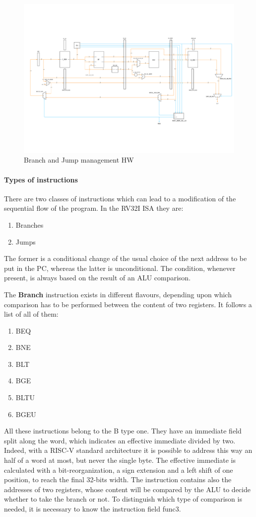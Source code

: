 \documentclass[a4paper]{article}
\begin{document}
\begin{figure}[hbtp]
    \centering
    \includegraphics[scale=0.2]{../br_jmp_management/ref/schematic/branchJump_management_schematic_5stages.pdf}
    \caption{Branch and Jump management HW}
    \label{fig:brJump_man_HW}
\end{figure}

\paragraph{Types of instructions}
There are two classes of instructions which can lead to a modification of the sequential flow of the program. In the RV32I ISA they are:
\begin{enumerate}
	\item Branches
	\item Jumps
\end{enumerate} 
The former is a conditional change of the usual choice of the next address to be put in the PC, whereas the latter is unconditional. The condition, whenever present, is always based on the result of an ALU comparison.

The \textbf{Branch} instruction exists in different flavours, depending upon which comparison has to be performed between the content of two registers. It follows a list of all of them:
\begin{enumerate}
	\item BEQ
	\item BNE
	\item BLT
	\item BGE
	\item BLTU
	\item BGEU
\end{enumerate} 
All these instructions belong to the B type one. They have an immediate field split along the word, which indicates an effective immediate divided by two. Indeed, with a RISC-V standard architecture it is possible to address this way an half of a word at most, but never the single byte.
The effective immediate is calculated with a bit-reorganization, a sign extension and a left shift of one position, to reach the final 32-bits width.
The instruction contains also the addresses of two registers, whose content will be compared by the ALU to decide whether to take the branch or not. 
To distinguish which type of comparison is needed, it is necessary to know the instruction field func3.
\end{document}
